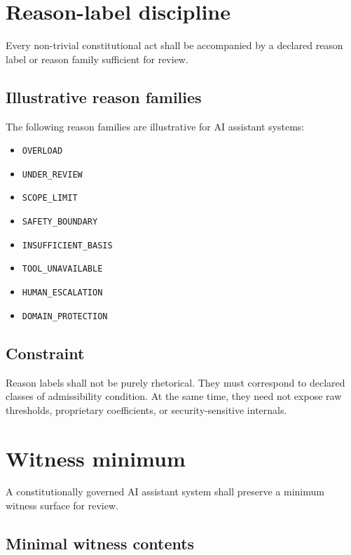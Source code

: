 \documentclass[11pt]{article}
\begin{document}
\section{Reason-label discipline}

Every non-trivial constitutional act shall be accompanied by a declared reason label or reason family sufficient for review.

\subsection*{Illustrative reason families}

The following reason families are illustrative for AI assistant systems:
\begin{itemize}[leftmargin=2em]
    \item \texttt{OVERLOAD}
    \item \texttt{UNDER\_REVIEW}
    \item \texttt{SCOPE\_LIMIT}
    \item \texttt{SAFETY\_BOUNDARY}
    \item \texttt{INSUFFICIENT\_BASIS}
    \item \texttt{TOOL\_UNAVAILABLE}
    \item \texttt{HUMAN\_ESCALATION}
    \item \texttt{DOMAIN\_PROTECTION}
\end{itemize}

\subsection*{Constraint}

Reason labels shall not be purely rhetorical. They must correspond to declared classes of admissibility condition. At the same time, they need not expose raw thresholds, proprietary coefficients, or security-sensitive internals.

\section{Witness minimum}

A constitutionally governed AI assistant system shall preserve a minimum witness surface for review.

\subsection*{Minimal witness contents}
\end{document}
